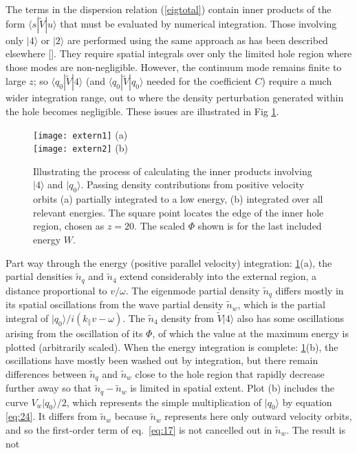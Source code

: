 \documentclass[12pt]{article}
\def\ket#1{|#1\rangle}
\def\bra#1{\langle#1}
\begin{document}
The terms in the dispersion relation (\ref{eigtotal}) contain inner
products of the form $\bra{s}|\tilde V\ket{u}$ that must be evaluated
by numerical integration. Those involving only $\ket{4}$ or $\ket{2}$
are performed using the same approach as has been described elsewhere
[]. They require spatial integrals over only the limited hole region where
those modes are non-negligible. However, the continuum mode remains
finite to large $z$; so $\bra{q_{0}}|\tilde{V}\ket{4}$ (and
$\bra{q_{0}}|\tilde{V}\ket{q_0}$ needed for the coefficient $C$)
require a much wider integration range, out to where the density
perturbation generated within the hole becomes negligible. These issues are
illustrated in Fig \ref{externfig}.
\begin{figure}
  \texttt{[image: extern1]} (a)\\
  \texttt{[image: extern2]} (b)
  \caption{Illustrating the process of calculating the inner products
    involving $\ket{4}$ and $\ket{q_0}$. Passing density contributions
    from positive velocity orbits (a) partially integrated to a low
    energy, (b) integrated over all relevant energies. The square
    point locates the edge of the inner hole region, chosen as
    $z=20$. The scaled $\Phi$ shown is for the last included energy
    $W$.\label{externfig}}
\end{figure}
Part way through the energy (positive parallel velocity) integration:
\ref{externfig}(a), the partial densities $\tilde n_q$ and
$\tilde n_4$ extend considerably into the external region, a distance
proportional to $v/\omega$. The eigenmode partial density $\tilde n_q$
differs mostly in its spatial oscillations from the wave partial
density $\tilde n_w$, which is the partial integral of
$\ket{q_0}/i(k_\parallel v -\omega)$. The $\tilde n_4$ density from
$\tilde V\ket{4}$ also has some oscillations arising from the
oscillation of its $\Phi$, of which the value at the maximum energy is
plotted (arbitrarily scaled). When the energy integration is complete:
\ref{externfig}(b), the oscillations have mostly been washed out by
integration, but there remain differences between $\tilde n_q$ and
$\tilde n_w$ close to the hole region that rapidly decrease further
away so that $\tilde n_q-\tilde n_w$ is limited in spatial
extent. Plot (b) includes the curve $V_w\ket{q_0}/2$, which represents
the simple multiplication of $\ket{q_0}$ by equation \ref{eq:24}. It
differs from $\tilde n_w$ because $\tilde n_w$ represents here only
outward velocity orbits, and so the first-order term of eq.\
\ref{eq:17} is not cancelled out in $\tilde n_w$. The result is not
\end{document}
